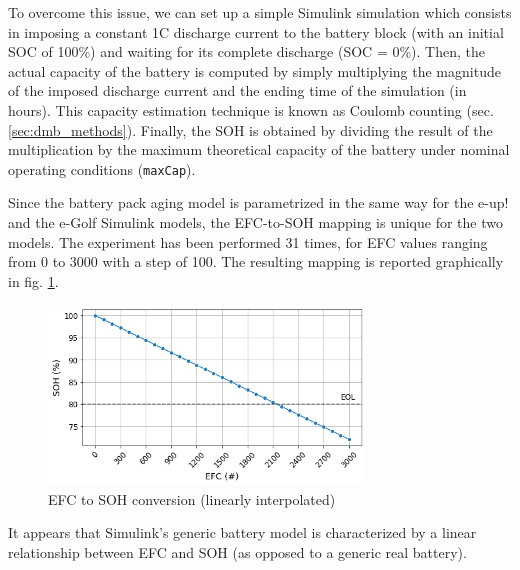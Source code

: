 To overcome this issue, we can set up a simple Simulink simulation which consists in imposing a constant 1C discharge current to the battery block (with an initial SOC of 100\%) and waiting for its complete discharge (SOC = 0\%). Then, the actual capacity of the battery is computed by simply multiplying the magnitude of the imposed discharge current and the ending time of the simulation (in hours). This capacity estimation technique is known as Coulomb counting (sec. \ref{sec:dmb_methods}). Finally, the SOH is obtained by dividing the result of the multiplication by the maximum theoretical capacity of the battery under nominal operating conditions (\texttt{maxCap}).

Since the battery pack aging model is parametrized in the same way for the e-up! and the e-Golf Simulink models, the EFC-to-SOH mapping is unique for the two models. The experiment has been performed 31 times, for EFC values ranging from 0 to 3000 with a step of 100. The resulting mapping is reported graphically in fig. \ref{fig:efc2soh}.

\begin{figure}[hbt!]
    \centering
    \includegraphics[width=0.75\textwidth]{images/efc2soh}
    \caption[EFC to SOH conversion]{EFC to SOH conversion (linearly interpolated)}
    \label{fig:efc2soh}
\end{figure}

It appears that Simulink's generic battery model is characterized by a linear relationship between EFC and SOH (as opposed to a generic real battery).







